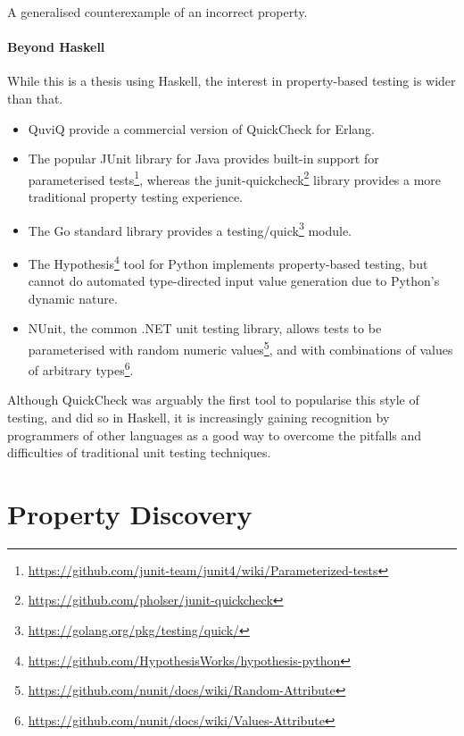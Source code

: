 \begin{listing}
\centering
{}
\caption{A generalised counterexample of an incorrect property.}\label{lst:gencntr}
\end{listing}

\paragraph{Beyond Haskell}
While this is a thesis using Haskell, the interest in property-based testing is
wider than that.

\begin{itemize}
\item QuviQ provide a commercial version of QuickCheck for
  Erlang\cite{arts2006}.
\item The popular JUnit library for Java provides built-in support for parameterised
  tests\footnote{\url{https://github.com/junit-team/junit4/wiki/Parameterized-tests}},
  whereas the
  junit-quickcheck\footnote{\url{https://github.com/pholser/junit-quickcheck}}
  library provides a more traditional property testing experience.
\item The Go standard library provides a
  testing/quick\footnote{\url{https://golang.org/pkg/testing/quick/}} module.
\item The
  Hypothesis\footnote{\url{https://github.com/HypothesisWorks/hypothesis-python}}
  tool for Python implements property-based testing, but cannot do automated
  type-directed input value generation due to Python's dynamic nature.
\item NUnit, the common .NET unit testing library, allows tests to be
  parameterised with random numeric
  values\footnote{\url{https://github.com/nunit/docs/wiki/Random-Attribute}},
  and with combinations of values of arbitrary
  types\footnote{\url{https://github.com/nunit/docs/wiki/Values-Attribute}}.
\end{itemize}

Although QuickCheck was arguably the first tool to popularise this style of
testing, and did so in Haskell, it is increasingly gaining recognition by
programmers of other languages as a good way to overcome the pitfalls and
difficulties of traditional unit testing techniques.

\section{Property Discovery}
\label{sec:property_testing-gen}

